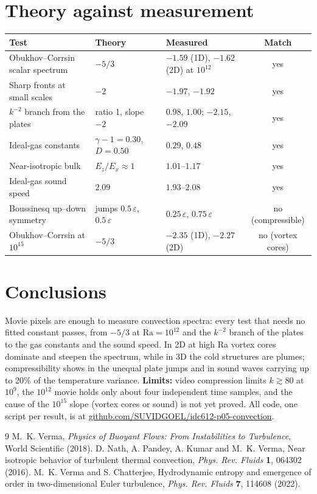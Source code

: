 \documentclass[11pt,a4paper]{article}
\begin{document}
\section{Theory against measurement}
\begin{center}\small
\begin{tabular}{@{}p{5.2cm}p{3.0cm}p{5.6cm}c@{}}
\toprule
\textbf{Test} & \textbf{Theory} & \textbf{Measured} & \textbf{Match}\\
\midrule
Obukhov--Corrsin scalar spectrum & $-5/3$ & $-1.59$ (1D), $-1.62$ (2D) at $10^{12}$ & yes\\
Sharp fronts at small scales & $-2$ & $-1.97$, $-1.92$ & yes\\
$k^{-2}$ branch from the plates & ratio 1, slope $-2$ & $0.98$, $1.00$; $-2.15$, $-2.09$ & yes\\
Ideal-gas constants & $\gamma-1=0.30$, $D=0.50$ & $0.29$, $0.48$ & yes\\
Near-isotropic bulk & $E_z/E_x\approx1$ & $1.01$--$1.17$ & yes\\
Ideal-gas sound speed & $2.09$ & $1.93$--$2.08$ & yes\\
Boussinesq up--down symmetry & jumps $0.5\,\varepsilon$, $0.5\,\varepsilon$ & $0.25\,\varepsilon$, $0.75\,\varepsilon$ & no (compressible)\\
Obukhov--Corrsin at $10^{15}$ & $-5/3$ & $-2.35$ (1D), $-2.27$ (2D) & no (vortex cores)\\
\bottomrule
\end{tabular}\end{center}

\section{Conclusions}
Movie pixels are enough to measure convection spectra: every test that needs no fitted constant passes, from $-5/3$ at $\mathrm{Ra}=10^{12}$ and the $k^{-2}$ branch of the plates to the gas constants and the sound speed. In 2D at high Ra vortex cores dominate and steepen the spectrum, while in 3D the cold structures are plumes; compressibility shows in the unequal plate jumps and in sound waves carrying up to 20\% of the temperature variance. \textbf{Limits:} video compression limits $k\gtrsim80$ at $10^{9}$, the $10^{12}$ movie holds only about four independent time samples, and the cause of the $10^{15}$ slope (vortex cores or sound) is not yet proved. All code, one script per result, is at \href{https://github.com/SUVIDGOEL/idc612-p05-convection}{github.com/SUVIDGOEL/idc612-p05-convection}.

\begin{thebibliography}{9}\small
{} M.~K. Verma, \emph{Physics of Buoyant Flows: From Instabilities to Turbulence}, World Scientific (2018).
 D. Nath, A. Pandey, A. Kumar and M.~K. Verma, Near isotropic behavior of turbulent thermal convection, \emph{Phys. Rev. Fluids} \textbf{1}, 064302 (2016).
 M.~K. Verma and S. Chatterjee, Hydrodynamic entropy and emergence of order in two-dimensional Euler turbulence, \emph{Phys. Rev. Fluids} \textbf{7}, 114608 (2022).
\end{thebibliography}
\end{document}
